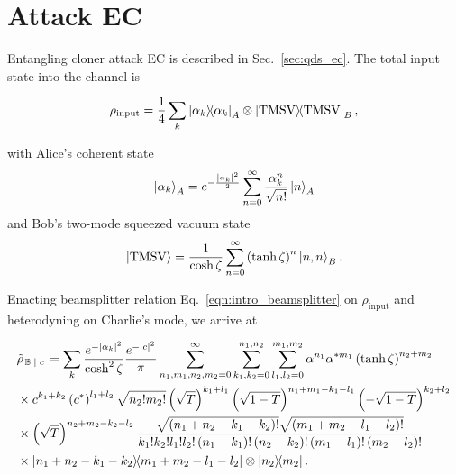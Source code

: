 \section{Attack EC}\label{appendix:ec_state}
Entangling cloner attack EC is described in Sec.~\ref{sec:qds_ec}. The total input state into the channel is

\begin{equation}
\rho_{\text{input}} = \frac{1}{4}\sum_k \dyad{\alpha_k}_A \otimes \dyad{\text{TMSV}}_B,
\end{equation}

\noindent with Alice's coherent state
\begin{equation}
\ket{\alpha_k}_A = e^{- \frac{\left| \alpha_k \right|^2}{2}} \sum_{n=0}^\infty \frac{\alpha_k^n}{\sqrt{n!}} \ket{n}_A
\end{equation}
and Bob's two-mode squeezed vacuum state
\begin{equation}
\ket{\text{TMSV}} = \frac{1}{\cosh{\zeta}}\sum_{n=0}^\infty \left(\tanh{\zeta}\right)^n \ket{n, n}_B.
\end{equation}

\noindent Enacting beamsplitter relation Eq.~\ref{eqn:intro_beamsplitter} on $\rho_{\text{input}}$ and heterodyning on Charlie's mode, we arrive at 

\begin{align}\label{eqn:appendix_ec_state}
&\tilde{\rho}_{\left. \mathbb{B} \given c\right.} = \sum_k\frac{e^{- \left|\alpha_k\right|^2}}{\cosh^2 \zeta}\frac{e^{-\left|c\right|^2}}{\pi} \sum_{n_1, m_1, n_2, m_2=0}^\infty \sum_{k_1, k_2 = 0}^{n_1, n_2} \sum_{l_1, l_2 = 0}^{m_1, m_2} \alpha^{n_1} \alpha^{* m_1} \left(\tanh{\zeta}\right)^{n_2 + m_2} \notag \\
%
&\times c^{k_1 + k_2} \left(c^*\right)^{l_1 + l_2} \sqrt{n_2! m_2!} \left(\sqrt{T}\right)^{k_1 + l_1} \left(\sqrt{1-T}\right)^{n_1 + m_1 - k_1 - l_1} \left(- \sqrt{1-T}\right)^{k_2 + l_2} \notag \\ %
&\times \left( \sqrt{T}\right)^{n_2 + m_2 - k_2 - l_2}
\frac{\sqrt{\left(n_1 + n_2 - k_1 - k_2\right)!} \sqrt{\left(m_1 + m_2 - l_1 - l_2\right)!}}{k_1! k_2! l_1! l_2! \left(n_1 - k_1\right)! \left(n_2 - k_2\right)! \left(m_1 - l_1\right)! \left(m_2 - l_2\right)!} \notag \\
%
&\times \dyad{n_1 + n_2 - k_1 - k_2}{m_1 + m_2 - l_1 - l_2}\otimes \dyad{n_2}{m_2}.
\end{align}








